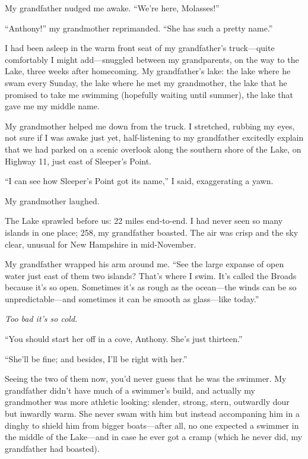 \titlemark

My grandfather nudged me awake. ``We're here, Molasses!''

``Anthony!'' my grandmother reprimanded. ``She has such a pretty name.''

I had been asleep in the warm front seat of my grandfather's
truck---quite comfortably I might add---snuggled between my
grandparents, on the way to the Lake, three weeks after homecoming. My
grandfather's lake: the lake where he swam every Sunday, the lake where
he met my grandmother, the lake that he promised to take me swimming
(hopefully waiting until summer), the lake that gave me my middle name.

My grandmother helped me down from the truck. I stretched, rubbing my
eyes, not sure if I was awake just yet, half-listening to my grandfather
excitedly explain that we had parked on a scenic overlook along the
southern shore of the Lake, on Highway 11, just east of Sleeper's Point.

``I can see how Sleeper's Point got its name,'' I said, exaggerating a
yawn.

My grandmother laughed.

The Lake sprawled before us: 22 miles end-to-end. I had never seen so
many islands in one place; 258, my grandfather boasted. The air was
crisp and the sky clear, unusual for New Hampshire in mid-November.

My grandfather wrapped his arm around me. ``See the large expanse of
open water just east of them two islands? That's where I swim. It's
called the Broads because it's so open. Sometimes it's as rough as the
ocean---the winds can be so unpredictable---and sometimes it can be
smooth as glass---like today.''

\emph{Too bad it's so cold.}

``You should start her off in a cove, Anthony. She's just thirteen.''

``She'll be fine; and besides, I'll be right with her.''

Seeing the two of them now, you'd never guess that he was the swimmer.
My grandfather didn't have much of a swimmer's build, and actually my
grandmother was more athletic looking: slender, strong, stern, outwardly
dour but inwardly warm. She never swam with him but instead accompaning
him in a dinghy to shield him from bigger boats---after all, no one
expected a swimmer in the middle of the Lake---and in case he ever got a
cramp (which he never did, my grandfather had boasted).


